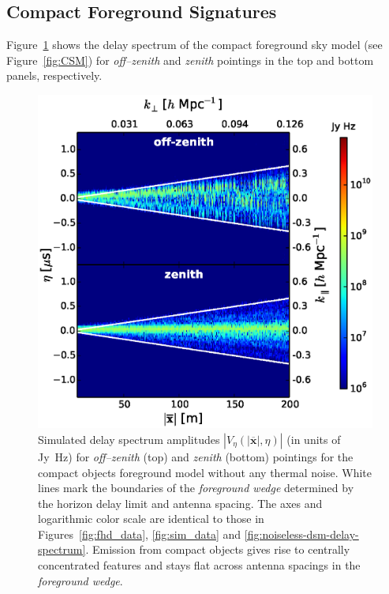 \documentclass[preprint2,iop,numberedappendix]{emulateapj}
\begin{document}
\subsection{Compact Foreground Signatures}\label{sec:compact}

Figure~\ref{fig:noiseless-csm-delay-spectrum} shows the delay spectrum of the compact foreground sky model (see Figure~\ref{fig:CSM}) for {\it off--zenith} and {\it zenith} pointings in the top and bottom panels, respectively. 

\begin{figure}[htb]
\centering
\includegraphics[width=\linewidth]{figures/v1_0/delta_array_multi_baseline_CLEAN_noiseless_visibilities_0.3m_ground_custom_gaussian_FG_model_csm_all_sky_nside_64_Tsys_95.0K_185.0_MHz_30.7_MHz_bhw2.0.eps}
\caption{Simulated delay spectrum amplitudes $|V_\eta(|\overline{\mathbf{x}}|,\eta)|$ (in units of Jy~Hz) for {\it off--zenith} (top) and {\it zenith} (bottom) pointings for the compact objects foreground model without any thermal noise. White lines mark the boundaries of the {\it foreground wedge} determined by the horizon delay limit and antenna spacing. The axes and logarithmic color scale are identical to those in Figures~\ref{fig:fhd_data}, \ref{fig:sim_data} and \ref{fig:noiseless-dsm-delay-spectrum}. Emission from compact objects gives rise to centrally concentrated features and stays flat across antenna spacings in the {\it foreground wedge}.\label{fig:noiseless-csm-delay-spectrum}}
\end{figure}
\end{document}
